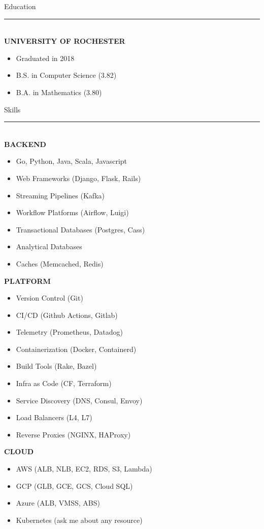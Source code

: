 \documentclass[letterpaper]{article}
\makeatletter
\newcommand{\fillbox}[1]{\resizebox{\textwidth}{!}{\begin{tabular}{@{}l@{}} #1 \end{tabular}}}
\makeatother
\begin{document}
	\noindent{}\noindent
	\begin{bgbox}[height=\paperheight, colback=gray!15, width=0.38\textwidth, left=0.12in, right=0.11in]\raggedright
		\vspace*{-4pt}
		\fillbox{\thin Brandon\\[-6pt] \thin Willett}\vspace*{12pt}
		{\Huge{Education}}\\[-6pt]
		\noindent\rule{\textwidth}{1pt}\\[12pt]
		\textbf{UNIVERSITY OF ROCHESTER}
		\begin{itemize} [noitemsep,topsep=4pt]
			\item Graduated in 2018
			\item B.S. in Computer Science (3.82)
			\item B.A. in Mathematics (3.80)
		\end{itemize}
		\vspace*{20pt}
		{\Huge{Skills}}\\[-6pt]
		\noindent\rule{\textwidth}{1pt}\\[12pt]
		\textbf{BACKEND}
		\begin{itemize} [noitemsep,topsep=4pt]
			\item Go, Python, Java, Scala, Javascript
			\item Web Frameworks (Django, Flask, Rails)
			\item Streaming Pipelines (Kafka)
			\item Workflow Platforms (Airflow, Luigi)
			\item Transactional Databases (Postgres, Cass)
			\item Analytical Databases
			\item Caches (Memcached, Redis)
		\end{itemize}
		\vspace*{12pt}
		\textbf{PLATFORM}
		\begin{itemize} [noitemsep,topsep=4pt]
			\item Version Control (Git)
			\item CI/CD (Github Actions, Gitlab)
			\item Telemetry (Prometheus, Datadog)
			\item Containerization (Docker, Containerd)
			\item Build Tools (Rake, Bazel)
			\item Infra as Code (CF, Terraform)
			\item Service Discovery (DNS, Consul, Envoy)
			\item Load Balancers (L4, L7)
			\item Reverse Proxies (NGINX, HAProxy)
		\end{itemize}
		\vspace*{12pt}
		\textbf{CLOUD}
		\begin{itemize} [noitemsep,topsep=4pt]
			\item AWS (ALB, NLB, EC2, RDS, S3, Lambda)
			\item GCP (GLB, GCE, GCS, Cloud SQL)
			\item Azure (ALB, VMSS, ABS)
			\item Kubernetes (ask me about any resource)
		\end{itemize}
	\end{bgbox}%
\end{document}
